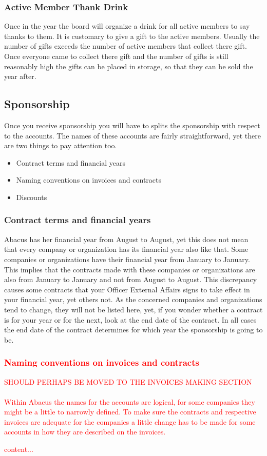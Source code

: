 \documentclass{report}
\begin{document}
\subsubsection{Active Member Thank Drink}
Once in the year the board will organize a drink for all active members to say thanks to them. It is customary to give a gift to the active members. Usually the number of gifts exceeds the number of active members that collect there gift. Once everyone came to collect there gift and the number of gifts is still reasonably high the gifts can be placed in storage, so that they can be sold the year after. 
\subsection{Sponsorship}
Once you receive sponsorship you will have to splits the sponsorship with respect to the accounts. The names of these accounts are fairly straightforward, yet there are two things to pay attention too.
\begin{itemize}
	\item Contract terms and financial years
	\item Naming conventions on invoices and contracts
	\item Discounts
\end{itemize}
\subsubsection{Contract terms and financial years}
Abacus has her financial year from August to August, yet this does not mean that every company or organization has its financial year also like that. Some companies or organizations have their financial year from January to January. This implies that the contracts made with these companies or organizations are also from January to January and not from August to August. This discrepancy causes some contracts that your Officer External Affairs signs to take effect in your financial year, yet others not. As the concerned companies and organizations tend to change, they will not be listed here, yet, if you wonder whether a contract is for your year or for the next, look at the end date of the contract. In all cases the end date of the contract determines for which year the sponsorship is going to be.   
\textcolor{red}{\subsubsection{Naming conventions on invoices and contracts}
	SHOULD PERHAPS BE MOVED TO THE INVOICES MAKING SECTION\\ \\
Within Abacus the names for the accounts are logical, for some companies they might be a little to narrowly defined. To make sure the contracts and respective invoices are adequate for the companies a little change has to be made for some accounts in how they are described on the invoices. 
\begin{table}
	\begin{tabular}
		content...
	\end{tabular}
\end{table}
}
\end{document}
